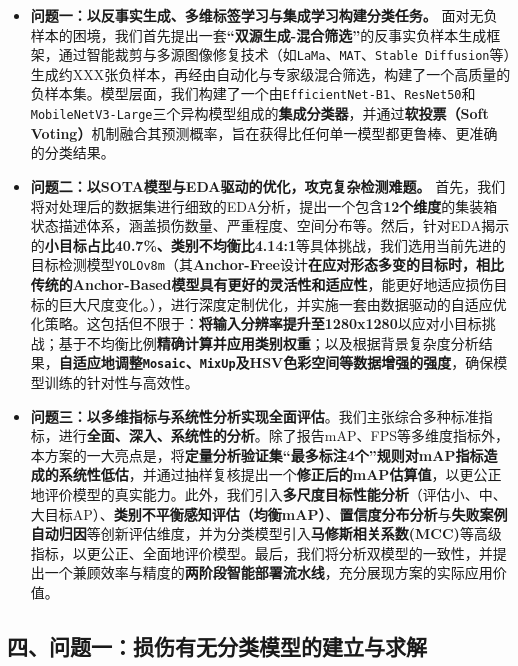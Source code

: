 \documentclass[
]{article}
\begin{document}
\begin{itemize}
\item
  \textbf{问题一：以反事实生成、多维标签学习与集成学习构建分类任务。}
  面对无负样本的困境，我们首先提出一套\textbf{``双源生成-混合筛选''}的反事实负样本生成框架，通过智能裁剪与多源图像修复技术（如\texttt{LaMa}、\texttt{MAT}、\texttt{Stable\ Diffusion}等）生成约XXX张负样本，再经由自动化与专家级混合筛选，构建了一个高质量的负样本集。模型层面，我们构建了一个由\texttt{EfficientNet-B1}、\texttt{ResNet50}和\texttt{MobileNetV3-Large}三个异构模型组成的\textbf{集成分类器}，并通过\textbf{软投票（Soft
  Voting）}机制融合其预测概率，旨在获得比任何单一模型都更鲁棒、更准确的分类结果。
\item
  \textbf{问题二：以SOTA模型与EDA驱动的优化，攻克复杂检测难题。}
  首先，我们将对处理后的数据集进行细致的EDA分析，提出一个包含\textbf{12个维度}的集装箱状态描述体系，涵盖损伤数量、严重程度、空间分布等。然后，针对EDA揭示的\textbf{小目标占比40.7\%、类别不均衡比4.14:1}等具体挑战，我们选用当前先进的目标检测模型\texttt{YOLOv8m}（其\textbf{Anchor-Free}设计\textbf{在应对形态多变的目标时，相比传统的Anchor-Based模型具有更好的灵活性和适应性}，能更好地适应损伤目标的巨大尺度变化。），进行深度定制优化，并实施一套由数据驱动的自适应优化策略。这包括但不限于：\textbf{将输入分辨率提升至1280x1280}以应对小目标挑战；基于不均衡比例\textbf{精确计算并应用类别权重}；以及根据背景复杂度分析结果，\textbf{自适应地调整\texttt{Mosaic}、\texttt{MixUp}及HSV色彩空间等数据增强的强度}，确保模型训练的针对性与高效性。
\item
  \textbf{问题三：以多维指标与系统性分析实现全面评估}。我们主张综合多种标准指标，进行\textbf{全面、深入、系统性的分析}。除了报告mAP、FPS等多维度指标外，本方案的一大亮点是，将\textbf{定量分析验证集``最多标注4个''规则对mAP指标造成的系统性低估}，并通过抽样复核提出一个\textbf{修正后的mAP估算值}，以更公正地评价模型的真实能力。此外，我们引入\textbf{多尺度目标性能分析}（评估小、中、大目标AP）、\textbf{类别不平衡感知评估（均衡mAP）}、\textbf{置信度分布分析}与\textbf{失败案例自动归因}等创新评估维度，并为分类模型引入\textbf{马修斯相关系数(MCC)}等高级指标，以更公正、全面地评价模型。最后，我们将分析双模型的一致性，并提出一个兼顾效率与精度的\textbf{两阶段智能部署流水线}，充分展现方案的实际应用价值。
\end{itemize}

\subsection{\texorpdfstring{四、\textbf{问题一：}损伤有无分类模型的建立与求解}{四、问题一：损伤有无分类模型的建立与求解}}\label{ux56dbux95eeux9898ux4e00ux635fux4f24ux6709ux65e0ux5206ux7c7bux6a21ux578bux7684ux5efaux7acbux4e0eux6c42ux89e3}
\end{document}
